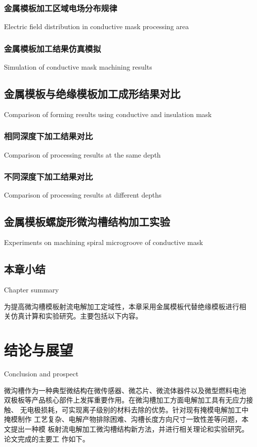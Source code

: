 \documentclass[
  type=doctor
]{../gdutthesis}
\begin{document}
\subsection{金属模板加工区域电场分布规律}{Electric field distribution in conductive mask processing area}

\subsection{金属模板加工结果仿真模拟}{Simulation of conductive mask machining results}

\section{金属模板与绝缘模板加工成形结果对比}{Comparison of forming results using conductive and insulation mask}

\subsection{相同深度下加工结果对比}{Comparison of processing results at the same depth}

\subsection{不同深度下加工结果对比}{Comparison of processing results at different depths}

\section{金属模板螺旋形微沟槽结构加工实验}{Experiments on machining spiral microgroove of conductive mask}

\section{本章小结}{Chapter summary}

为提高微沟槽模板射流电解加工定域性，本章采用金属模板代替绝缘模板进行相
关仿真计算和实验研究。主要包括以下内容。

\gdutbackmatter

\chapter{结论与展望}{Conclusion and prospect}


微沟槽作为一种典型微结构在微传感器、微芯片、微流体器件以及微型燃料电池
双极板等产品核心部件上发挥重要作用。在微沟槽加工方面电解加工具有无应力接触、
无电极损耗，可实现离子级别的材料去除的优势。针对现有掩模电解加工中掩模制作
工艺复杂、电解产物排除困难、沟槽长度方向尺寸一致性差等问题，本文提出一种模
板射流电解加工微沟槽结构新方法，并进行相关理论和实验研究。论文完成的主要工
作如下。
\end{document}
